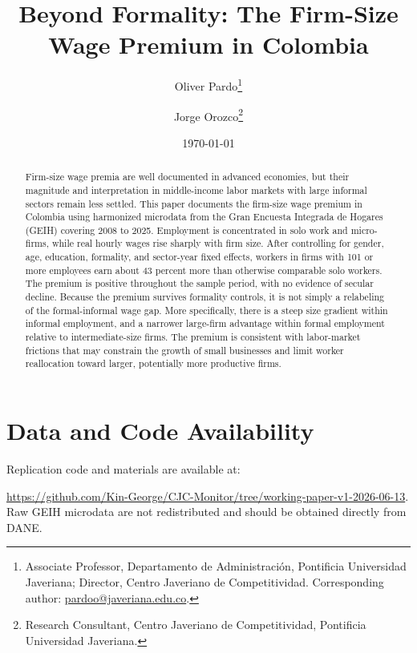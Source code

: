 \documentclass[12pt]{article}
\title{Beyond Formality: The Firm-Size Wage Premium in Colombia}
\author{
Oliver Pardo\thanks{Associate Professor, Departamento de Administración, Pontificia Universidad Javeriana; Director, Centro Javeriano de Competitividad. Corresponding author: \href{mailto:pardoo@javeriana.edu.co}{pardoo@javeriana.edu.co}.}
\and
Jorge Orozco\thanks{Research Consultant, Centro Javeriano de Competitividad, Pontificia Universidad Javeriana.}
}
\date{\today}
\begin{document}
\maketitle

\begin{abstract}
Firm-size wage premia are well documented in advanced economies, but their magnitude and interpretation in middle-income labor markets with large informal sectors remain less settled. This paper documents the firm-size wage premium in Colombia using harmonized microdata from the Gran Encuesta Integrada de Hogares (GEIH) covering 2008 to 2025. Employment is concentrated in solo work and micro-firms, while real hourly wages rise sharply with firm size. After controlling for gender, age, education, formality, and sector-year fixed effects, workers in firms with 101 or more employees earn about 43 percent more than otherwise comparable solo workers. The premium is positive throughout the sample period, with no evidence of secular decline. Because the premium survives formality controls, it is not simply a relabeling of the formal-informal wage gap. More specifically, there is a steep size gradient within informal employment, and a narrower large-firm advantage within formal employment relative to intermediate-size firms. The premium is consistent with labor-market frictions that may constrain the growth of small businesses and limit worker reallocation toward larger, potentially more productive firms.
\end{abstract}










\appendix


\section*{Data and Code Availability}

Replication code and materials are available at: 

\url{https://github.com/Kin-George/CJC-Monitor/tree/working-paper-v1-2026-06-13}. Raw GEIH microdata are not redistributed and should be obtained directly from DANE.



\end{document}
